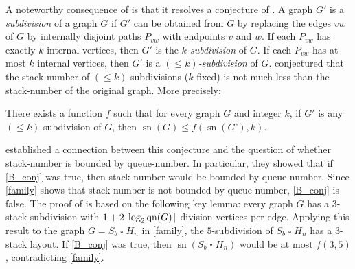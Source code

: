 \documentclass[kpfonts]{patmorin}
\DeclareMathOperator{\sn}{sn}
\DeclareMathOperator{\qn}{qn}
\renewcommand{\leq}{\leqslant}
\newcommand{\CartProd}{\mathbin{\square}}
\begin{document}
A noteworthy consequence of  is that it resolves a conjecture of \citet{BO99}. A graph $G'$ is a \textit{subdivision} of a graph $G$ if $G'$ can be obtained from $G$ by replacing the edges $vw$ of $G$ by internally disjoint paths $P_{vw}$ with endpoints $v$ and $w$. If each $P_{vw}$ has exactly $k$ internal vertices, then $G'$ is the \emph{$k$-subdivision} of $G$. If each $P_{vw}$ has at most $k$ internal vertices, then $G'$ is a \emph{$(\leq k)$-subdivision} of $G$. \citet{BO99} conjectured that the stack-number of $(\leq k)$-subdivisions ($k$ fixed)  is not much less than the stack-number of the original graph. More precisely:

\begin{conj}[\citep{BO99}]
\label{B_conj}
There exists a function $f$ such that for every graph $G$ and integer $k$, if $G'$ is any $(\leq k)$-subdivision of $G$, then $\sn(G) \leq f(\sn(G’),k)$.
\end{conj}

\citet{DujWoo05} established a connection between this conjecture and the question of whether stack-number is bounded by queue-number. In particular, they showed that if
\cref{B_conj} was true, then stack-number would be bounded by queue-number. Since \cref{family} shows that stack-number is not bounded by queue-number, \cref{B_conj} is false. The proof of \citet{DujWoo05} is based on the following key lemma: every graph $G$ has a $3$-stack subdivision with $1+2 \ceil{\log_2\qn(G)}$ division vertices per edge. Applying this result to the graph $G=S_b\CartProd H_n$ in \cref{family},
the $5$-subdivision of $S_b\CartProd H_n$ has a $3$-stack layout. If \cref{B_conj} was true, then  $\sn(S_b\CartProd H_n)$ would be at most $f( 3,5)$, contradicting \cref{family}.




\end{document}
